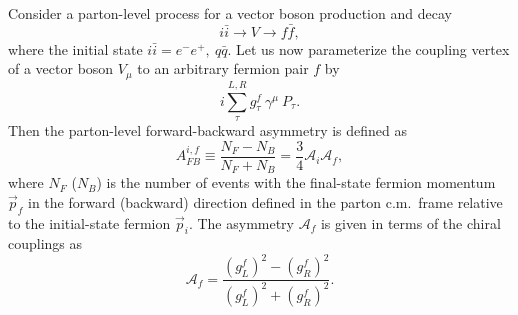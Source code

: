 \documentclass[12pt,prd,aps,floats,preprintnumbers,preprint,superscriptaddress,floatfix,nofootinbib]{revtex4}
\def\be{\begin{equation}}
\def\ee{\end{equation}}
\begin{document}
Consider a parton-level process for a vector boson production and decay
\be
i\bar i \to V \to f \bar f,
\ee
where the initial state $i\bar i=e^-e^+,\ q\bar q$. 
Let us now parameterize the coupling vertex of a vector boson $V_\mu$ to 
an arbitrary  fermion pair $f$ by
\be
i \sum_\tau^{L,R} g_\tau^f \ \gamma^\mu\ P_\tau.
\ee
Then the parton-level forward-backward asymmetry is defined as
\be
A^{i,f}_{FB} \equiv  \frac{N_F - N_B}{N_F + N_B}
	= \frac{3}{4} \mathcal{A}_i \mathcal{A}_f,
\ee
where $N_F$ ($N_B$) is the number of events with the final-state fermion
momentum  $\vec p_f$ 
in the forward (backward) direction defined in the parton c.m.~frame
relative to the initial-state fermion  $\vec p_i$.  
The asymmetry $\mathcal{A}_f$ is given in 
terms of the chiral couplings as
\begin{equation}
	\mathcal{A}_f = \frac{(g_L^f)^2 - (g_R^f)^2}{(g_L^f)^2 + (g_R^f)^2}.
\end{equation}
\end{document}

